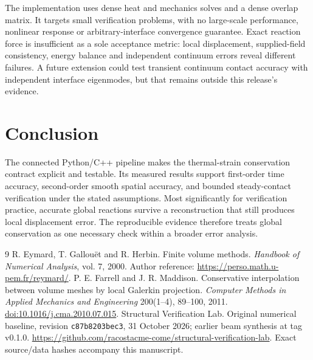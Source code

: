 \documentclass[10pt,a4paper]{article}
\begin{document}
The implementation uses dense heat and mechanics solves and a dense overlap matrix. It targets small verification problems, with no large-scale performance, nonlinear response or arbitrary-interface convergence guarantee. Exact reaction force is insufficient as a sole acceptance metric: local displacement, supplied-field consistency, energy balance and independent continuum errors reveal different failures. A future extension could test transient continuum contact accuracy with independent interface eigenmodes, but that remains outside this release's evidence.

\section{Conclusion}
The connected Python/C++ pipeline makes the thermal-strain conservation contract explicit and testable. Its measured results support first-order time accuracy, second-order smooth spatial accuracy, and bounded steady-contact verification under the stated assumptions. Most significantly for verification practice, accurate global reactions survive a reconstruction that still produces local displacement error. The reproducible evidence therefore treats global conservation as one necessary check within a broader error analysis.

\begin{thebibliography}{9}\small
{} R. Eymard, T. Gallou\"et and R. Herbin. Finite volume methods. \emph{Handbook of Numerical Analysis}, vol. 7, 2000. Author reference: \url{https://perso.math.u-pem.fr/reymard/}.
 P. E. Farrell and J. R. Maddison. Conservative interpolation between volume meshes by local Galerkin projection. \emph{Computer Methods in Applied Mechanics and Engineering} 200(1--4), 89--100, 2011. \href{https://doi.org/10.1016/j.cma.2010.07.015}{doi:10.1016/j.cma.2010.07.015}.
 Structural Verification Lab. Original numerical baseline, revision \texttt{c87b8203bec3}, 31 October 2026; earlier beam synthesis at tag v0.1.0. \url{https://github.com/racostacme-come/structural-verification-lab}. Exact source/data hashes accompany this manuscript.
\end{thebibliography}
\end{document}

